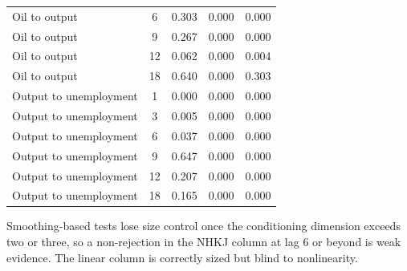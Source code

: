 \begin{table}[htbp]
\begin{tabular}{lcccc}
Oil to output & 6 & 0.303 & 0.000 & 0.000 \\
Oil to output & 9 & 0.267 & 0.000 & 0.000 \\
Oil to output & 12 & 0.062 & 0.000 & 0.004 \\
Oil to output & 18 & 0.640 & 0.000 & 0.303 \\
Output to unemployment & 1 & 0.000 & 0.000 & 0.000 \\
Output to unemployment & 3 & 0.005 & 0.000 & 0.000 \\
Output to unemployment & 6 & 0.037 & 0.000 & 0.000 \\
Output to unemployment & 9 & 0.647 & 0.000 & 0.000 \\
Output to unemployment & 12 & 0.207 & 0.000 & 0.000 \\
Output to unemployment & 18 & 0.165 & 0.000 & 0.000 \\
\bottomrule
\end{tabular}

\begin{minipage}{\linewidth}\footnotesize
Smoothing-based tests lose size control once the conditioning dimension exceeds two or three, so a non-rejection in the NHKJ column at lag 6 or beyond is weak evidence.  The linear column is correctly sized but blind to nonlinearity.
\end{minipage}
\end{table}

